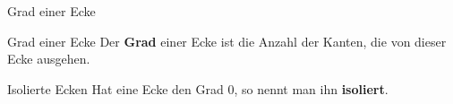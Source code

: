 \begin{frame}{Grad einer Ecke}
\begin{block}{Grad einer Ecke}
Der \textbf{Grad} einer Ecke ist die Anzahl der Kanten, die von dieser Ecke
ausgehen.
\end{block}

\begin{block}{Isolierte Ecken}
Hat eine Ecke den Grad 0, so nennt man ihn \textbf{isoliert}.
\end{block}

\begin{gallery}
    \\
\end{gallery}
\end{frame}
